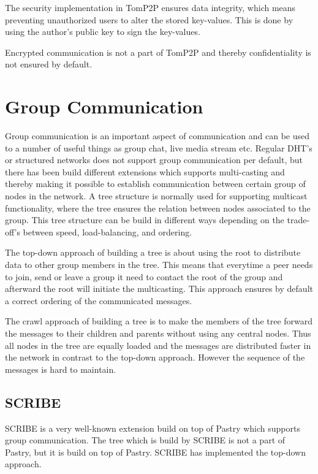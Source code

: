 The security implementation in TomP2P ensures data integrity, which means preventing unauthorized users to alter the stored key-values. This is done by using the author's public key to sign the key-values.

Encrypted communication is not a part of TomP2P and thereby confidentiality is not ensured by default.


\section{Group Communication}
Group communication is an important aspect of communication and can be used to a number of useful things as group chat, live media stream etc.
Regular DHT's or structured networks does not support group communication per default, but there has been build different extensions which supports multi-casting and thereby making it possible to establish communication between certain group of nodes in the network. 
A tree structure is normally used for supporting multicast functionality, where the tree ensures the relation between nodes associated to the group. This tree structure can be build in different ways depending on the trade-off's between speed, load-balancing, and ordering.

The top-down approach of building a tree is about using the root to distribute data to other group members in the tree. This means that everytime a peer needs to join, send or leave a group it need to contact the root of the group and afterward the root will initiate the multicasting. This approach ensures by default a correct ordering of the communicated messages. 

The crawl approach of building a tree is to make the members of the tree forward the messages to their children and parents without using any central nodes. Thus all nodes in the tree are equally loaded and the messages are distributed faster in the network in contrast to the top-down approach. However the sequence of the messages is hard to maintain. 

\subsection{SCRIBE}
SCRIBE is a very well-known extension build on top of Pastry which supports group communication. 
The tree which is build by SCRIBE is not a part of Pastry, but it is build on top of Pastry. SCRIBE has implemented the top-down approach. 

